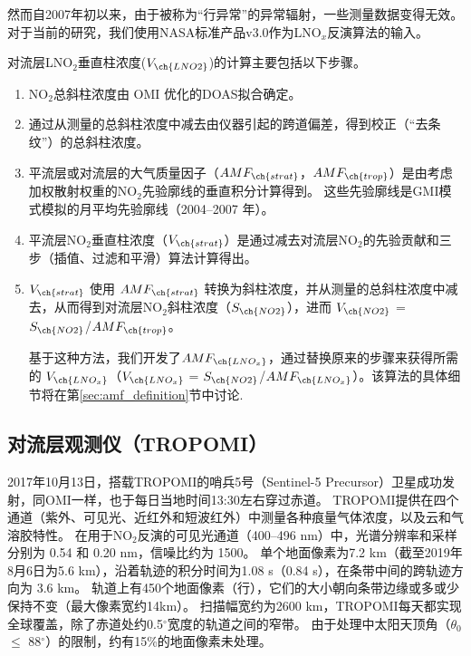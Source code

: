 然而自2007年初以来，由于被称为“行异常”的异常辐射\citep{Dobber.2008}，一些测量数据变得无效。
对于当前的研究，我们使用NASA标准产品v3.0\citep{Krotkov.2017}作为LNO$_x$反演算法的输入。

对流层LNO$_2$垂直柱浓度($V_{\ch{LNO2}}$)的计算主要包括以下步骤。

\begin{enumerate}[label=（\arabic*）, labelindent=\parindent, leftmargin=0pt, widest=0, itemindent=*, topsep=0pt, partopsep=0pt, parsep=0pt]

\item NO$_2$总斜柱浓度由 OMI 优化的DOAS拟合确定。

\item 通过从测量的总斜柱浓度中减去由仪器引起的跨道偏差，得到校正（“去条纹”）的总斜柱浓度。

\item 平流层或对流层的大气质量因子（$AMF_{\ch{strat}}$，$AMF_{\ch{trop}}$）是由考虑加权散射权重的NO$_2$先验廓线的垂直积分计算得到。
这些先验廓线是GMI模式模拟的月平均先验廓线（2004--2007 年）。

\item 平流层NO$_2$垂直柱浓度（$V_{\ch{strat}}$）是通过减去对流层NO$_2$的先验贡献和三步（插值、过滤和平滑）算法计算得出\citep{Bucsela.2013}。

\item $V_{\ch{strat}}$ 使用 $AMF_{\ch{strat}}$ 转换为斜柱浓度，并从测量的总斜柱浓度中减去，从而得到对流层NO$_2$斜柱浓度（$S_{\ch{NO2}}$），进而 $V_{\ch{NO2}}$ = $S_{\ch{NO2}}$/$AMF_{\ch{trop}}$。

基于这种方法，我们开发了$AMF_{\ch{LNO_x}}$，通过替换原来的步骤来获得所需的 $V_{\ch{LNO_x}}$（$V_{\ch{LNO_x}}$ = $S_{\ch{NO2}}$/$AMF_{\ch{LNO_x}}$）。该算法的具体细节将在第\ref{sec:amf_definition}节中讨论.

\end{enumerate}

\subsection{对流层观测仪（TROPOMI）}

2017年10月13日，搭载TROPOMI的哨兵5号（Sentinel-5 Precursor）卫星成功发射\citep{Veefkind.2012}，同OMI一样，也于每日当地时间13:30左右穿过赤道。
TROPOMI提供在四个通道（紫外、可见光、近红外和短波红外）中测量各种痕量气体浓度，以及云和气溶胶特性。
在用于NO$_2$反演的可见光通道（400–496 nm）中，光谱分辨率和采样分别为 0.54 和 0.20 nm，信噪比约为 1500。
单个地面像素为7.2 km（截至2019年8月6日为5.6 km），沿着轨迹的积分时间为1.08 s（0.84 s），在条带中间的跨轨迹方向为 3.6 km。
轨道上有450个地面像素（行），它们的大小朝向条带边缘或多或少保持不变（最大像素宽约14km）。
扫描幅宽约为2600 km，TROPOMI每天都实现全球覆盖，除了赤道处约0.5$^{\circ}$宽度的轨道之间的窄带。
由于处理中太阳天顶角（$\theta_0$ $\leq$ 88$^{\circ}$）的限制，约有15\%的地面像素未处理。

